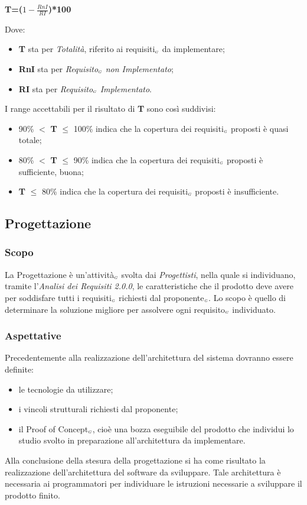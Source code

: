 \begin{center}
	\textbf{T=($1-\frac{RnI}{RI}$)*100}
\end{center}
Dove:
\begin{itemize}
	\item \textbf{T} sta per \textit{Totalità}, riferito ai requisiti$_{\scaleto{G}{3pt}}$ da implementare;
	\item \textbf{RnI} sta per \textit{Requisito$_{\scaleto{G}{3pt}}$ non Implementato};
	\item \textbf{RI} sta per \textit{Requisito$_{\scaleto{G}{3pt}}$ Implementato}.
\end{itemize}
I range accettabili per il risultato di \textbf{T} sono così suddivisi:
\begin{itemize}
	\item 90\% $<$ \textbf{T} $\leq$ 100\% indica che la copertura dei requisiti$_{\scaleto{G}{3pt}}$ proposti è quasi totale;
	\item 80\% $<$ \textbf{T} $\leq$ 90\% indica che la copertura dei requisiti$_{\scaleto{G}{3pt}}$ proposti è sufficiente, buona;
	\item \textbf{T} $\leq$ 80\% indica che la copertura dei requisiti$_{\scaleto{G}{3pt}}$ proposti è insufficiente.
\end{itemize}


\subsection{Progettazione}\label{ProcessiPrimariProgettazione}
\subsubsection{Scopo}\label{ProcessiPrimariProgettazioneScopo}
La Progettazione è un'attività$_{\scaleto{G}{3pt}}$ svolta dai \textit{Progettisti}, nella quale si individuano, tramite l'\textit{Analisi dei Requisiti 2.0.0}, le caratteristiche che il prodotto deve avere per soddisfare tutti i requisiti$_{\scaleto{G}{3pt}}$ richiesti dal proponente$_{\scaleto{G}{3pt}}$. Lo scopo è quello di determinare la soluzione migliore per assolvere ogni requisito$_{\scaleto{G}{3pt}}$ individuato.
\subsubsection{Aspettative}\label{ProcessiPrimariProgettazioneAspettative}
Precedentemente alla realizzazione dell'architettura del sistema dovranno essere definite:
\begin{itemize}
	\item le tecnologie da utilizzare;
	\item i vincoli strutturali richiesti dal proponente;
	\item il Proof of Concept$_{\scaleto{G}{3pt}}$, cioè una bozza eseguibile del prodotto che individui lo studio svolto in preparazione all'architettura da implementare. 
\end{itemize}
Alla conclusione della stesura della progettazione si ha come risultato la realizzazione dell'architettura del software da sviluppare. Tale architettura è necessaria ai programmatori per individuare le istruzioni necessarie a sviluppare il prodotto finito. 
